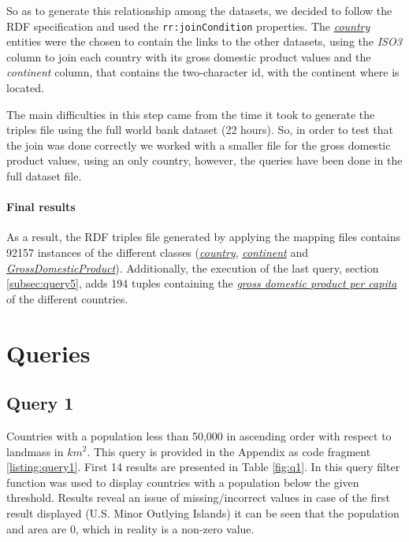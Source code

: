 \documentclass[11pt]{article}
\begin{document}
So as to generate this relationship among the datasets, we decided to follow the RDF specification and used the \texttt{rr:joinCondition} properties. The \href{http://mappings.dbpedia.org/server/ontology/classes/Country}{\textit{country}} entities were the chosen to contain the links to the other datasets, using the \textit{ISO3} column to join each country with its gross domestic product values and the \textit{continent} column, that contains the two-character id, with the continent where is located.

The main difficulties in this step came from the time it took to generate the triples file using the full world bank dataset (22 hours). So, in order to test that the join was done correctly we worked with a smaller file for the gross domestic product values, using an only country, however, the queries have been done in the full dataset file.

\paragraph{Final results}
As a result, the RDF triples file generated by applying the mapping files contains 92157 instances of the different classes (\href{http://mappings.dbpedia.org/server/ontology/classes/Country}{\textit{country}}, \href{http://mappings.dbpedia.org/server/ontology/classes/Continent}{\textit{continent}} and \href{http://mappings.dbpedia.org/server/ontology/classes/GrossDomesticProduct}{\textit{GrossDomesticProduct}}). 
Additionally, the execution of the last query, section \ref{subsec:query5}, adds 194 tuples containing the \href{http://mappings.dbpedia.org/server/ontology/classes/GrossDomesticProductPerCapita}{\textit{gross domestic product per capita}} of the different countries.

\section{Queries}


\subsection{Query 1\label{subsec:query1}}
Countries with a population less than 50,000 in ascending order with respect to landmass in $km^2$. This query is provided in the Appendix as code fragment \ref{listing:query1}. First 14 results are presented in Table \ref{fig:q1}. In this query filter function was used to display countries with a population below the given threshold. Results reveal an issue of missing/incorrect values in case of the first result displayed (U.S. Minor Outlying Islands) it can be seen that the population and area are 0, which in reality is a non-zero value.
\end{document}
